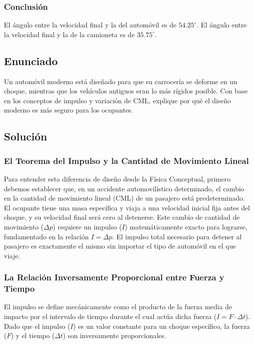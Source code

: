 \documentclass{article}
\begin{document}
\subsubsection*{Conclusión}
El ángulo entre la velocidad final y la del automóvil es de $54.25^\circ$. El ángulo entre la velocidad final y la de la camioneta es de $35.75^\circ$.

\newpage

\subsection*{Enunciado}
Un automóvil moderno está diseñado para que su carrocería se deforme en un choque, mientras que los vehículos antiguos eran lo más rígidos posible. Con base en los conceptos de impulso y variación de CML, explique por qué el diseño moderno es más seguro para los ocupantes.

\subsection*{Solución}

\subsubsection*{El Teorema del Impulso y la Cantidad de Movimiento Lineal}
Para entender esta diferencia de diseño desde la Física Conceptual, primero debemos establecer que, en un accidente automovilístico determinado, el cambio en la cantidad de movimiento lineal (CML) de un pasajero está predeterminado. El ocupante tiene una masa específica y viaja a una velocidad inicial fija antes del choque, y su velocidad final será cero al detenerse. Este cambio de cantidad de movimiento ($\Delta p$) requiere un impulso ($I$) matemáticamente exacto para lograrse, fundamentado en la relación $I = \Delta p$. El impulso total necesario para detener al pasajero es exactamente el mismo sin importar el tipo de automóvil en el que viaje.

\subsubsection*{La Relación Inversamente Proporcional entre Fuerza y Tiempo}
El impulso se define mecánicamente como el producto de la fuerza media de impacto por el intervalo de tiempo durante el cual actúa dicha fuerza ($I = F \cdot \Delta t$). Dado que el impulso ($I$) es un valor constante para un choque específico, la fuerza ($F$) y el tiempo ($\Delta t$) son inversamente proporcionales. 
\end{document}
